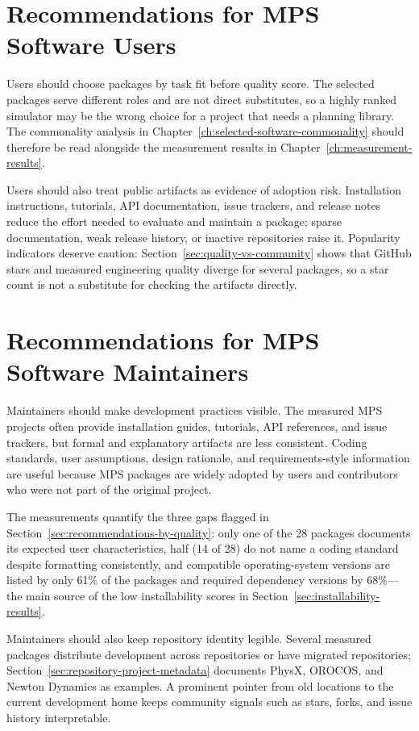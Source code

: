 \section{Recommendations for MPS Software Users}
\label{sec:recommendations-users}

Users should choose packages by task fit before quality score. The selected packages serve different roles and are not direct substitutes, so a highly ranked simulator may be the wrong choice for a project that needs a planning library. The commonality analysis in Chapter~\ref{ch:selected-software-commonality} should therefore be read alongside the measurement results in Chapter~\ref{ch:measurement-results}.

Users should also treat public artifacts as evidence of adoption risk. Installation instructions, tutorials, API documentation, issue trackers, and release notes reduce the effort needed to evaluate and maintain a package; sparse documentation, weak release history, or inactive repositories raise it. Popularity indicators deserve caution: Section~\ref{sec:quality-vs-community} shows that GitHub stars and measured engineering quality diverge for several packages, so a star count is not a substitute for checking the artifacts directly.

\section{Recommendations for MPS Software Maintainers}
\label{sec:recommendations-maintainers}

Maintainers should make development practices visible. The measured MPS projects often provide installation guides, tutorials, API references, and issue trackers, but formal and explanatory artifacts are less consistent. Coding standards, user assumptions, design rationale, and requirements-style information are useful because MPS packages are widely adopted by users and contributors who were not part of the original project.

The measurements quantify the three gaps flagged in Section~\ref{sec:recommendations-by-quality}: only one of the 28 packages documents its expected user characteristics, half (14 of 28) do not name a coding standard despite formatting consistently, and compatible operating-system versions are listed by only 61\% of the packages and required dependency versions by 68\%---the main source of the low installability scores in Section~\ref{sec:installability-results}.

Maintainers should also keep repository identity legible. Several measured packages distribute development across repositories or have migrated repositories; Section~\ref{sec:repository-project-metadata} documents PhysX, OROCOS, and Newton Dynamics as examples. A prominent pointer from old locations to the current development home keeps community signals such as stars, forks, and issue history interpretable.

